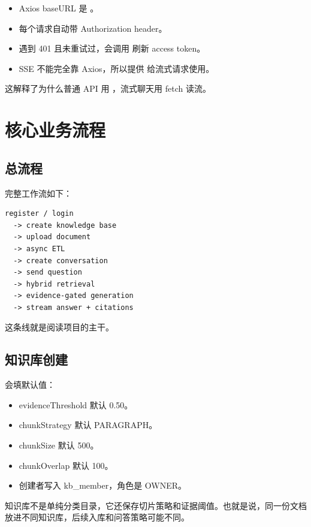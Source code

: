 \documentclass[UTF8,zihao=-4]{ctexart}
\begin{document}
\begin{itemize}
  \item Axios baseURL 是 。
  \item 每个请求自动带 Authorization header。
  \item 遇到 401 且未重试过，会调用  刷新 access token。
  \item SSE 不能完全靠 Axios，所以提供  给流式请求使用。
\end{itemize}

这解释了为什么普通 API 用 ，流式聊天用 fetch 读流。

\section{核心业务流程}

\subsection{总流程}

完整工作流如下：

\begin{lstlisting}[style=code]
register / login
  -> create knowledge base
  -> upload document
  -> async ETL
  -> create conversation
  -> send question
  -> hybrid retrieval
  -> evidence-gated generation
  -> stream answer + citations
\end{lstlisting}

这条线就是阅读项目的主干。

\subsection{知识库创建}

 会填默认值：

\begin{itemize}
  \item evidenceThreshold 默认 0.50。
  \item chunkStrategy 默认 PARAGRAPH。
  \item chunkSize 默认 500。
  \item chunkOverlap 默认 100。
  \item 创建者写入 kb\_member，角色是 OWNER。
\end{itemize}

知识库不是单纯分类目录，它还保存切片策略和证据阈值。也就是说，同一份文档放进不同知识库，后续入库和问答策略可能不同。
\end{document}
